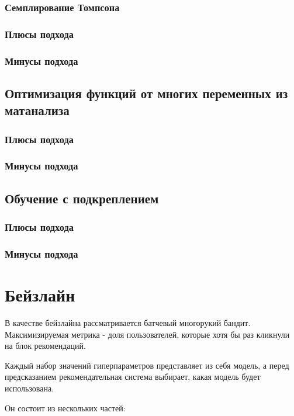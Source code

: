 \documentclass{article}
\begin{document}
\subsubsection{Семплирование Томпсона}

\subsubsection{Плюсы подхода}

\subsubsection{Минусы подхода}


\subsection{Оптимизация функций от многих переменных из матанализа}

\subsubsection{Плюсы подхода}

\subsubsection{Минусы подхода}


\subsection{Обучение с подкреплением}

\subsubsection{Плюсы подхода}

\subsubsection{Минусы подхода}


\section{Бейзлайн}
В качестве бейзлайна рассматривается батчевый многорукий бандит. Максимизируемая метрика - доля пользователей, которые хотя бы раз кликнули на блок рекомендаций. 

Каждый набор значений гиперпараметров представляет из себя модель, а перед предсказанием рекомендательная система выбирает, какая модель будет использована.
\par
Он состоит из нескольких частей:
\end{document}
